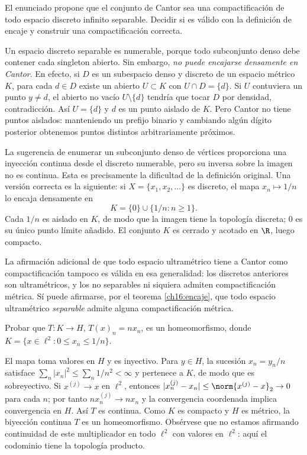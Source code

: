 \begin{ejercicio}\label{ej:lectura-16-3}
El enunciado propone que el conjunto de Cantor sea una compactificación de todo espacio discreto infinito separable. Decidir si es válido con la definición de encaje y construir una compactificación correcta.
\end{ejercicio}
\begin{solucion}
Un espacio discreto separable es numerable, porque todo subconjunto denso debe contener cada singleton abierto. Sin embargo, \emph{no puede encajarse densamente en Cantor}. En efecto, si $D$ es un subespacio denso y discreto de un espacio métrico $K$, para cada $d\in D$ existe un abierto $U\subset K$ con $U\cap D=\{d\}$. Si $U$ contuviera un punto $y\ne d$, el abierto no vacío $U\setminus\{d\}$ tendría que tocar $D$ por densidad, contradicción. Así $U=\{d\}$ y $d$ es un punto aislado de $K$. Pero Cantor no tiene puntos aislados: manteniendo un prefijo binario y cambiando algún dígito posterior obtenemos puntos distintos arbitrariamente próximos.

La sugerencia de enumerar un subconjunto denso de vértices proporciona una inyección continua desde el discreto numerable, pero su inversa sobre la imagen no es continua. Esta es precisamente la dificultad de la definición original. Una versión correcta es la siguiente: si $X=\{x_1,x_2,\ldots\}$ es discreto, el mapa $x_n\mapsto1/n$ lo encaja densamente en
\[
K=\{0\}\cup\{1/n:n\ge1\}.
\]
Cada $1/n$ es aislado en $K$, de modo que la imagen tiene la topología discreta; $0$ es su único punto límite añadido. El conjunto $K$ es cerrado y acotado en $\R$, luego compacto.

La afirmación adicional de que todo espacio ultramétrico tiene a Cantor como compactificación tampoco es válida en esa generalidad: los discretos anteriores son ultramétricos, y los no separables ni siquiera admiten compactificación métrica. Sí puede afirmarse, por el teorema \ref{ch16:encaje}, que todo espacio ultramétrico \emph{separable} admite alguna compactificación métrica.
\end{solucion}

\begin{ejercicio}\label{ej:lectura-16-4}
Probar que $T:K\to H$, $T(x)_n=nx_n$, es un homeomorfismo, donde $K=\{x\in\ell^2:0\le x_n\le1/n\}$.
\end{ejercicio}
\begin{solucion}
El mapa toma valores en $H$ y es inyectivo. Para $y\in H$, la sucesión $x_n=y_n/n$ satisface $\sum_n|x_n|^2\le\sum_n1/n^2<\infty$ y pertenece a $K$, de modo que es sobreyectivo. Si $x^{(j)}\to x$ en $\ell^2$, entonces $|x_n^{(j)}-x_n|\le\norm{x^{(j)}-x}_2\to0$ para cada $n$; por tanto $nx_n^{(j)}\to nx_n$ y la convergencia coordenada implica convergencia en $H$. Así $T$ es continua. Como $K$ es compacto y $H$ es métrico, la biyección continua $T$ es un homeomorfismo. Obsérvese que no estamos afirmando continuidad de este multiplicador en todo $\ell^2$ con valores en $\ell^2$: aquí el codominio tiene la topología producto.
\end{solucion}


